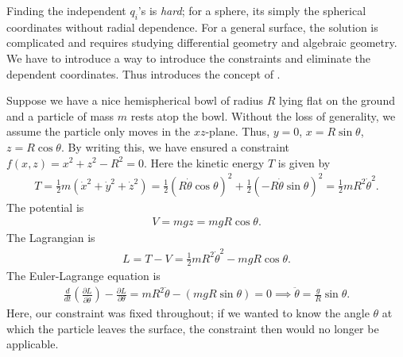 Finding the independent $q_{i}$'s is \textit{hard}; for a sphere, its simply the spherical coordinates without radial dependence. For a general surface, the solution is complicated and requires studying differential geometry and algebraic geometry. We have to introduce a way to introduce the constraints and eliminate the dependent coordinates. Thus introduces the concept of .



Suppose we have a nice hemispherical bowl of radius $R$ lying flat on the ground and a particle of mass $m$ rests atop the bowl. Without the loss of generality, we assume the particle only moves in the $xz$-plane. Thus, $y = 0$, $x = R \sin \theta$, $z = R \cos \theta$. By writing this, we have ensured a constraint $f(x,z) = x^{2}+z^{2}-R^{2} = 0$. Here the kinetic energy $T$ is given by
\begin{align}
    T = \frac{1}{2} m(\dot{x}^{2}+\dot{y}^{2}+\dot{z}^{2}) = \frac{1}{2}(R\dot{\theta} \cos \theta)^{2} + \frac{1}{2}(-R \dot{\theta} \sin \theta)^{2} = \frac{1}{2} m R^{2} \dot{\theta}^{2}.
\end{align}
The potential is
\begin{align}
    V = mgz = mgR \cos \theta.
\end{align}
The Lagrangian is
\begin{align}
    L = T - V = \frac{1}{2} m R^{2} \dot{\theta}^{2} - mgR \cos \theta.
\end{align}
The Euler-Lagrange equation is
\begin{align}
    \frac{d}{dt}\left( \frac{\partial L}{\partial \dot{\theta}} \right) - \frac{\partial L}{\partial \theta} = mR^{2}\ddot{\theta}-(mgR \sin \theta) = 0 \implies \ddot{\theta} = \frac{g}{R} \sin \theta.
\end{align}
Here, our constraint was fixed throughout; if we wanted to know the angle $\theta$ at which the particle leaves the surface, the constraint then would no longer be applicable.

